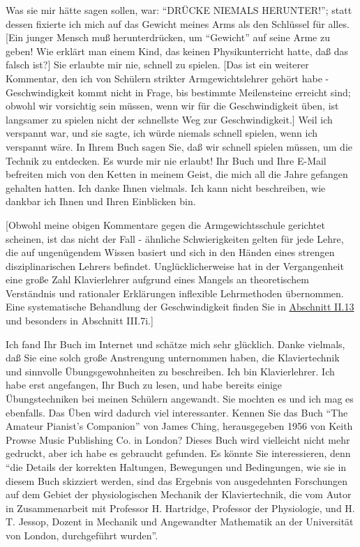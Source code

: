 Was sie mir hätte sagen sollen, war: \enquote{DRÜCKE NIEMALS HERUNTER!}; statt dessen fixierte ich mich auf das Gewicht meines Arms als den Schlüssel für alles.
[Ein junger Mensch muß herunterdrücken, um \enquote{Gewicht} auf seine Arme zu geben!
Wie erklärt man einem Kind, das keinen Physikunterricht hatte, daß das falsch ist?]
Sie erlaubte mir nie, schnell zu spielen.
[Das ist ein weiterer Kommentar, den ich von Schülern strikter Armgewichtslehrer gehört habe - Geschwindigkeit kommt nicht in Frage, bis bestimmte Meilensteine erreicht sind; obwohl wir vorsichtig sein müssen, wenn wir für die Geschwindigkeit üben, ist langsamer zu spielen nicht der schnellste Weg zur Geschwindigkeit.]
Weil ich verspannt war, und sie sagte, ich würde niemals schnell spielen, wenn ich verspannt wäre.
In Ihrem Buch sagen Sie, daß wir schnell spielen müssen, um die Technik zu entdecken.
Es wurde mir nie erlaubt!
Ihr Buch und Ihre E-Mail befreiten mich von den Ketten in meinem Geist, die mich all die Jahre gefangen gehalten hatten.
Ich danke Ihnen vielmals.
Ich kann nicht beschreiben, wie dankbar ich Ihnen und Ihren Einblicken bin.

[Obwohl meine obigen Kommentare gegen die Armgewichtsschule gerichtet scheinen, ist das nicht der Fall - ähnliche Schwierigkeiten gelten für jede Lehre, die auf ungenügendem Wissen basiert und sich in den Händen eines strengen disziplinarischen Lehrers befindet.
Unglücklicherweise hat in der Vergangenheit eine große Zahl Klavierlehrer aufgrund eines Mangels an theoretischem Verständnis und rationaler Erklärungen inflexible Lehrmethoden übernommen.
Eine systematische Behandlung der Geschwindigkeit finden Sie in \hyperlink{c1ii13}{Abschnitt II.13} und besonders in Abschnitt III.7i.]


\item \hypertarget{testimonials07}{}
Ich fand Ihr Buch im Internet und schätze mich sehr glücklich.
Danke vielmals, daß Sie eine solch große Anstrengung unternommen haben, die Klaviertechnik und sinnvolle Übungsgewohnheiten zu beschreiben.
Ich bin Klavierlehrer.
Ich habe erst angefangen, Ihr Buch zu lesen, und habe bereits einige Übungstechniken bei meinen Schülern angewandt.
Sie mochten es und ich mag es ebenfalls.
Das Üben wird dadurch viel interessanter.
Kennen Sie das Buch \enquote{The Amateur Pianist's Companion} von James Ching, herausgegeben 1956 von Keith Prowse Music Publishing Co. in London?
Dieses Buch wird vielleicht nicht mehr gedruckt, aber ich habe es gebraucht gefunden.
Es könnte Sie interessieren, denn \enquote{die Details der korrekten Haltungen, Bewegungen und Bedingungen, wie sie in diesem Buch skizziert werden, sind das Ergebnis von ausgedehnten Forschungen auf dem Gebiet der physiologischen Mechanik der Klaviertechnik, die vom Autor in Zusammenarbeit mit Professor H. Hartridge, Professor der Physiologie, und H. T. Jessop, Dozent in Mechanik und Angewandter Mathematik an der Universität von London, durchgeführt wurden}.


